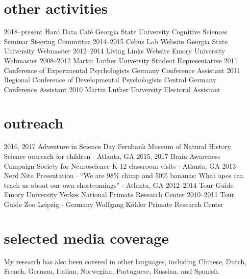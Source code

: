 \documentclass[]{friggeri-cv}
\begin{document}
\section{other activities}

\begin{entrylist}
  \entry
    {2018--present}
    {Hard Data Café}
    {Georgia State University}
    {Cognitive Sciences Seminar Steering Committee}
  \entry
    {2014--2015}
    {Cebus Lab Website}
    {Georgia State University}
    {Webmaster}
  \entry
    {2012--2014}
    {Living Links Website}
    {Emory University}
    {Webmaster}
  \entry
    {2008--2012}
    {Martin Luther University}
    {}
    {Student Representative}
 \entry
   {2011}
   {Conference of Experimental Psychologists}
   {Germany}
   {Conference Assistant}
 \entry
   {2011}
   {Regional Conference of Developmental Psychologists}
   {Central Germany}
   {Conference Assistant}
 \entry
   {2010}
   {Martin Luther University}
   {}
   {Electoral Assistant}
\end{entrylist}



\section{outreach}

\begin{entrylist}
  \entry
    {2016, 2017}
    {Adventure in Science Day}
    {Fernbank Museum of Natural History}
    {Science outreach for children $\cdot$ Atlanta, GA}
  \entry
    {2015, 2017}
    {Brain Awareness Campaign}
    {Society for Neuroscience}
    {K-12 classroom visits $\cdot$ Atlanta, GA}
  \entry
    {2013}
    {Nerd Nite}
    {}
    {Presentation $\cdot$ ``We are 98\% chimp and 50\% bananas: What apes can teach us about our own shortcomings'' $\cdot$ Atlanta, GA}
  \entry
    {2012--2014}
    {Tour Guide}
    {Emory University}
    {Yerkes National Primate Research Center}
  \entry
    {2010--2011}
    {Tour Guide}
    {Zoo Leipzig $\cdot$ Germany}
    {Wolfgang K\"{o}hler Primate Research Center}
\end{entrylist}



\section{selected media coverage}
\vspace{-.1cm}
{\small{} My research has also been covered in other languages, including Chinese, Dutch,  French, German, Italian, Norwegian, Portuguese, Russian, and Spanish.}\\[.7cm]
\end{document}
